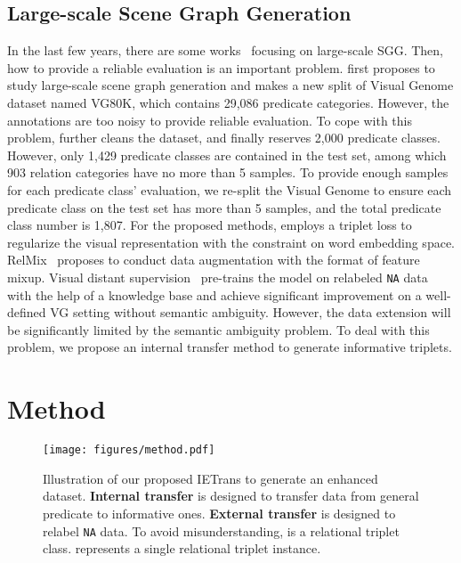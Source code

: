 \documentclass[runningheads]{llncs}
\begin{document}
\subsection{Large-scale Scene Graph Generation}
In the last few years, there are some works~\cite{abdelkarim2020long,zhuang2018hcvrd,zhang2019large,yao2021visual} focusing on large-scale SGG. 
Then, how to provide a reliable evaluation is an important problem.
\cite{zhang2019large} first proposes to study large-scale scene graph generation and makes a new split of Visual Genome dataset named VG80K, which contains 29,086 predicate categories.
However, the annotations are too noisy to provide reliable evaluation.
To cope with this problem, \cite{abdelkarim2020long} further cleans the dataset, and finally reserves 2,000 predicate classes.
However, only 1,429 predicate classes are contained in the test set, among which 903 relation categories have no more than 5 samples.
To provide enough samples for each predicate class' evaluation, we re-split the Visual Genome to ensure each predicate class on the test set has more than 5 samples, and the total predicate class number is 1,807.
For the proposed methods, \cite{zhang2019large} employs a triplet loss to regularize the visual representation with the constraint on word embedding space.
RelMix~\cite{abdelkarim2020long} proposes to conduct data augmentation with the format of feature mixup.
Visual distant supervision~\cite{yao2021visual} pre-trains the model on relabeled \texttt{NA} data with the help of a knowledge base and achieve significant improvement on a well-defined VG setting without semantic ambiguity. 
However, the data extension will be significantly limited by the semantic ambiguity problem. 
To deal with this problem, we propose an internal transfer method to generate informative triplets.


\section{Method}
\begin{figure*}[t]
    \centering
    \texttt{[image: figures/method.pdf]}
   \caption{Illustration of our proposed IETrans to generate an enhanced dataset. \textbf{Internal transfer} is designed to transfer data from general predicate to informative ones. \textbf{External transfer} is designed to relabel \texttt{NA} data. To avoid misunderstanding,  is a relational triplet class.
 represents a single relational triplet instance.}
    \label{fig:method}
\end{figure*}
\end{document}
